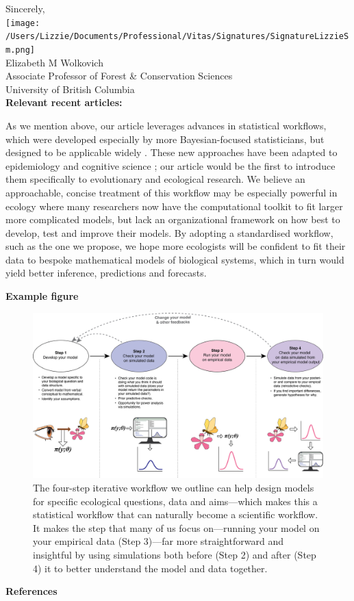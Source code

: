 \documentclass[11pt]{article}
\begin{document}
Sincerely,\\

\texttt{[image: /Users/Lizzie/Documents/Professional/Vitas/Signatures/SignatureLizzieSm.png]} \\

Elizabeth M Wolkovich\\
Associate Professor of Forest \& Conservation Sciences\\ 
University of British Columbia\\

{\bf Relevant recent articles:}

As we mention above, our article leverages advances in statistical workflows, which were developed especially by more Bayesian-focused statisticians,  but designed to be applicable widely \citep{betanworkflow,gelman2020bayesian}. These new approaches have been adapted to epidemiology and cognitive science  \citep{grinsztajn2021,schad2021}; our article would be the first to introduce them specifically to evolutionary and ecological research. We believe an approachable, concise treatment of this workflow may be especially powerful in ecology where many researchers now have the computational toolkit to fit larger more complicated models, but lack an organizational framework on how best to develop, test and improve their models. By adopting a standardised workflow, such as the one we propose, we hope more ecologists will be confident to fit their data to bespoke mathematical models of biological systems, which in turn would yield better inference, predictions and forecasts. 

\newpage
{\bf Example figure}

\begin{figure}[ht]
\centering
\noindent \includegraphics[width=1\textwidth]{..//figures/workflow.png}
\caption{The four-step iterative workflow we outline can help design models for specific ecological questions, data and aims---which makes this a statistical workflow that can naturally become a scientific workflow. It makes the step that many of us focus on---running your model on your empirical data (Step 3)---far more straightforward and insightful by using simulations both before (Step 2) and after (Step 4) it to better understand the model and data together.}
\label{fig:workflow}
\end{figure}

\newpage
{\bf References}
\vspace{-4ex}

\end{document}
